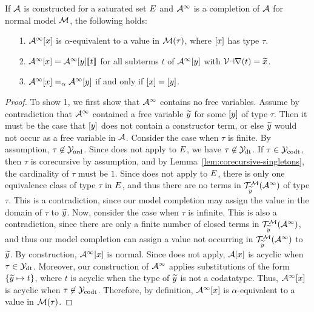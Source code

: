 \begin{lemma}
\label{lem:model-completion}
If $\mathcal{A}$ is constructed for a saturated set $E$
and $\mathcal{A}^\infty$ is a completion of $\mathcal{A}$ for normal model $\mathcal{M}$, the following holds:
\begin{enumerate}
\item[\rm 1.] $\mathcal{A}^\infty [x]$ is $\alpha$-equivalent to a value in $\mathcal{M}( \tau )$, where $[x]$ has type $\tau$.
\item[\rm 2.]
$\mathcal{A}^\infty [x] = \mathcal{A}^\infty [y] \llbracket  t  \rrbracket$ for
all subterms $t$ of $\mathcal{A}^\infty [y]$ with $\mathcal{Var}(t) = {\widetilde{x}}$. 
\item[\rm 3.]
$\mathcal{A}^\infty [x] \mathrel{=_\alpha} \mathcal{A}^\infty [y]$ if and only if $[x] = [y]$.
\end{enumerate}
\end{lemma}
\begin{report}
\begin{proof}
To show 1, we first show that $\mathcal{A}^\infty$ contains no free variables.
Assume by contradiction that $\mathcal{A}^\infty$ contained a free variable ${\widetilde{y}}$ for some $[y]$ of type $\tau$.
Then it must be the case that $[y]$ does not contain a constructor term,
or else ${\widetilde{y}}$ would not occur as a free variable in $\mathcal{A}$.
Consider the case when $\tau$ is finite.
By assumption, $\tau \not\in \mathcal{Y}_{\mathrm{ord}}$.
Since  does not apply to $E$, we have $\tau \not\in \mathcal{Y}_{\mathrm{dt}}$.
If $\tau \in \mathcal{Y}_{\mathrm{codt}}$, then $\tau$ is corecursive by assumption, and by Lemma~\ref{lem:corecursive-singletons},
the cardinality of $\tau$ must be $1$.
Since  does not apply to $E$,
there is only one equivalence class of type $\tau$ in $E$,
and thus there are no terms in $\mathcal{T}^{\mathcal{M}}_{\widetilde{y}}(\mathcal{A}^\infty)$ of type $\tau$.
This is a contradiction, since our model completion may assign the value in the domain of $\tau$ to ${\widetilde{y}}$.
Now, consider the case when $\tau$ is infinite.
This is also a contradiction,
since there are only a finite number of closed terms in $\mathcal{T}^{\mathcal{M}}_{\widetilde{y}}(\mathcal{A}^\infty)$,
and thus our model completion can assign a value not occurring in $\mathcal{T}^{\mathcal{M}}_{\widetilde{y}}(\mathcal{A}^\infty)$ to ${\widetilde{y}}$.
By construction, $\mathcal{A}^\infty [x]$ is normal.
Since  does not apply, $\mathcal{A} [x]$ is acyclic when $\tau \in \mathcal{Y}_{\mathrm{dt}}$.
Moreover, our construction of $\mathcal{A}^\infty$ applies substitutions of the form
$\{ {\widetilde{y}} \mapsto t \}$, where $t$ is acyclic when the type of ${\widetilde{y}}$ is not a codatatype.
Thus, $\mathcal{A}^\infty [x]$ is acyclic when $\tau \not\in \mathcal{Y}_{\mathrm{codt}}$.
Therefore, by definition, $\mathcal{A}^\infty [x]$ is $\alpha$-equivalent to a value in $\mathcal{M}( \tau )$.


\end{proof}
\end{report}
